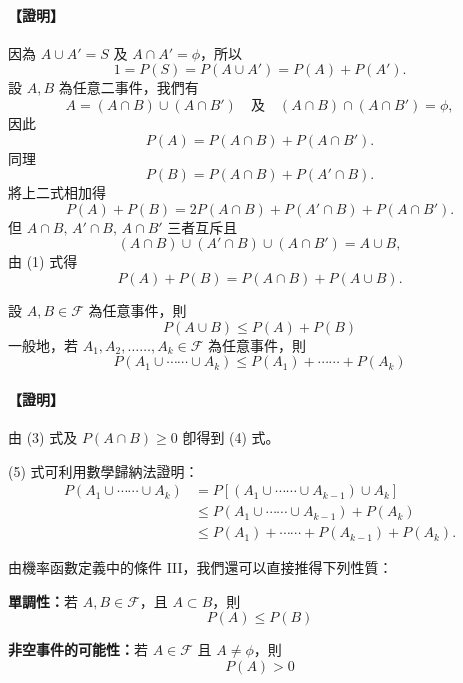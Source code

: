 \paragraph{【證明】}
因為 $A \cup A' = S$ 及 $A \cap A' = \phi$，所以
\[
1 = P(S) = P(A \cup A') = P(A) + P(A').
\]
設 $A, B$ 為任意二事件，我們有
\[
A = (A \cap B) \cup (A \cap B') \quad\text{及}\quad (A \cap B) \cap (A \cap B') = \phi,
\]
因此
\[
P(A) = P(A \cap B) + P(A \cap B').
\]
同理
\[
P(B) = P(A \cap B) + P(A' \cap B).
\]
將上二式相加得
\[
P(A) + P(B) = 2P(A \cap B) + P(A' \cap B) + P(A \cap B').
\]
但 $A \cap B,\, A' \cap B,\, A \cap B'$ 三者互斥且
\[
(A \cap B) \cup (A' \cap B) \cup (A \cap B') = A \cup B,
\]
由 (1) 式得
\[
P(A) + P(B) = P(A \cap B) + P(A \cup B). \tag*{\#}
\]

\medskip
\begin{corollary*}
設 $A, B \in \mathscr{F}$ 為任意事件，則
\begin{equation}
P(A \cup B) \le P(A) + P(B) \label{eq:b5-ch4-4}
\end{equation}
一般地，若 $A_1, A_2, \dots\dots, A_k \in \mathscr{F}$ 為任意事件，則
\begin{equation}
P(A_1 \cup \cdots\cdots \cup A_k) \le P(A_1) + \cdots\cdots + P(A_k) \label{eq:b5-ch4-5}
\end{equation}
\end{corollary*}
\paragraph{【證明】}
由 (3) 式及 $P(A \cap B) \ge 0$ 卽得到 (4) 式。

(5) 式可利用數學歸納法證明：
\begin{align*}
P(A_1 \cup \cdots\cdots \cup A_k) &= P[(A_1 \cup \cdots\cdots \cup A_{k-1}) \cup A_k] \\
&\le P(A_1 \cup \cdots\cdots \cup A_{k-1}) + P(A_k) \\
&\le P(A_1) + \cdots\cdots + P(A_{k-1}) + P(A_k). \tag*{\#}
\end{align*}

由機率函數定義中的條件 III，我們還可以直接推得下列性質：

\medskip
\noindent\textbf{單調性：}若 $A, B \in \mathscr{F}$，且 $A \subset B$，則
\begin{equation}
P(A) \le P(B) \label{eq:b5-ch4-6}
\end{equation}

\noindent\textbf{非空事件的可能性：}若 $A \in \mathscr{F}$ 且 $A \neq \phi$，則
\begin{equation}
P(A) > 0 \label{eq:b5-ch4-7}
\end{equation}

